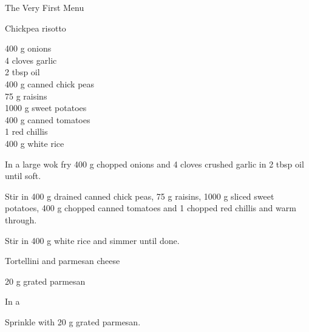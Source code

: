 \begin{menu}{The Very First Menu}
    \begin{recipe}{2}{Chickpea risotto}%
    
		\begin{ingredients}
		400 g onions  \\
	4 cloves garlic  \\
	2 tbsp oil  \\
	400 g canned chick peas  \\
	75 g raisins  \\
	1000 g sweet potatoes  \\
	400 g canned tomatoes  \\
	1  red chillis  \\
	400 g white rice  \\
	
		\end{ingredients}
	
    \begin{instructions}
    \item 
        In a large wok fry
        400 g chopped onions
        and
        4 cloves crushed garlic
        in
        2 tbsp  oil
        until soft.
      \item 
        Stir in
        400 g drained canned chick peas,
        75 g  raisins,
        1000 g sliced sweet potatoes,
        400 g chopped canned tomatoes
        and
        1  chopped red chillis
        and warm through.
      \item 
        Stir in 
        400 g  white rice
        and simmer until done.
      
    \end{instructions}
    \end{recipe}%
  
    \begin{recipe}{1}{Tortellini and parmesan cheese}%
    
		\begin{ingredients}
		20 g grated parmesan  \\
	
		\end{ingredients}
	
    \begin{instructions}
    \item 
      In a
    \item 
        Sprinkle with
        20 g  grated parmesan.
      
    \end{instructions}
    \end{recipe}%
  
    \clearpage
    \end{menu}
	
